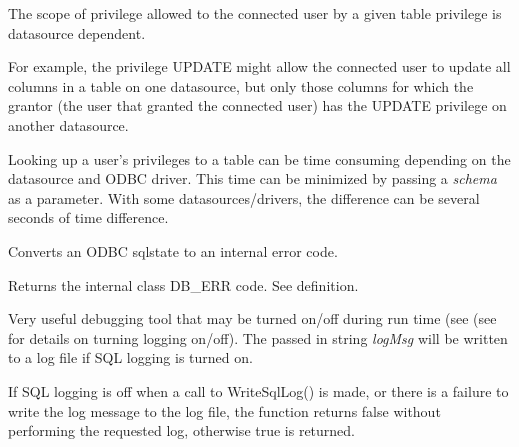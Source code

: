 

The scope of privilege allowed to the connected user by a given table
privilege is datasource dependent.

For example, the privilege UPDATE might allow the connected user to update
all columns in a table on one datasource, but only those columns for
which the grantor (the user that granted the connected user) has the UPDATE
privilege on another datasource.

Looking up a user's privileges to a table can be time consuming depending on the
datasource and ODBC driver.  This time can be minimized by passing a {\it schema}
as a parameter.  With some datasources/drivers, the difference can be several
seconds of time difference.


\label{wxdbtranslatesqlstate}


Converts an ODBC sqlstate to an internal error code.




Returns the internal class DB\_ERR code.  See  definition.

\label{wxdbwritesqllog}





Very useful debugging tool that may be turned on/off during run time (see
(see  for details on
turning logging on/off).  The passed in string {\it logMsg} will be written to
a log file if SQL logging is turned on.


If SQL logging is off when a call to WriteSqlLog() is made, or there is a
failure to write the log message to the log file, the function returns
false without performing the requested log, otherwise true is returned.

